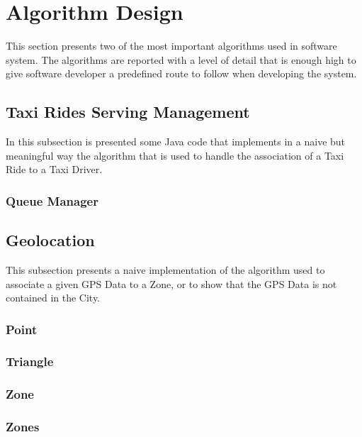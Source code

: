 \section{Algorithm Design}

This section presents two of the most important algorithms used in \myTaxiService{} software system.
The algorithms are reported with a level of detail that is enough high to give software developer a predefined route to follow when developing the system.

\subsection{Taxi Rides Serving Management}
In this subsection is presented some Java code that implements in a naive but meaningful way the algorithm that is used to handle the association of a Taxi Ride to a Taxi Driver.
\subsubsection{Queue Manager}

\subsection{Geolocation}
This subsection presents a naive implementation of the algorithm used to associate a given GPS Data to a Zone, or to show that the GPS Data is not contained in the City.
\subsubsection{Point}
\subsubsection{Triangle}
\subsubsection{Zone}
\subsubsection{Zones}
